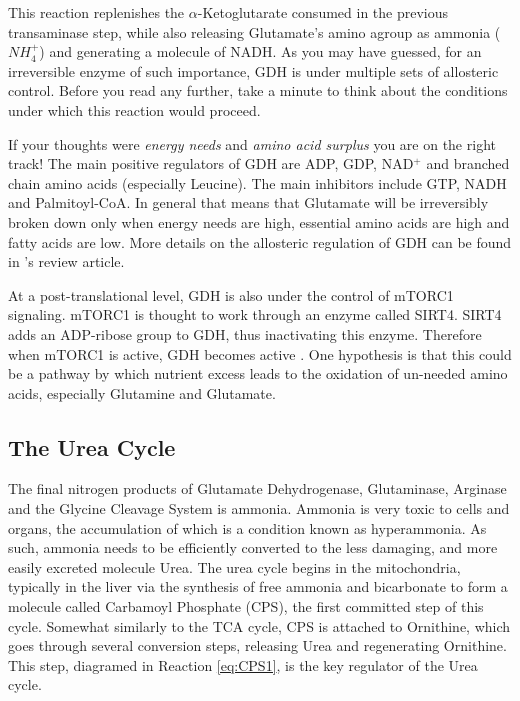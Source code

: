 \documentclass{tufte-handout}
\begin{document}
This reaction replenishes the $\alpha$-Ketoglutarate consumed in the previous transaminase step, while also releasing Glutamate's amino agroup as ammonia ($NH_4^+$) and generating a molecule of NADH.  As you may have guessed, for an irreversible enzyme of such importance, GDH is under multiple sets of allosteric control.  Before you read any further, take a minute to think about the conditions under which this reaction would proceed.

If your thoughts were \emph{energy needs} and \emph{amino acid surplus} you are on the right track!  The main positive regulators of GDH are ADP, GDP, NAD$^+$ and branched chain amino acids (especially Leucine).  The main inhibitors include GTP, NADH and Palmitoyl-CoA.  In general that means that Glutamate will be irreversibly broken down only when energy needs are high, essential amino acids are high and fatty acids are low.  More details on the allosteric regulation of GDH can be found in \citet{Smith2008}'s review article.  

At a post-translational level, GDH is also under the control of mTORC1 signaling.  mTORC1 is thought to work through an enzyme called SIRT4.  SIRT4 adds an ADP-ribose group to GDH, thus inactivating this enzyme.  Therefore when mTORC1 is active, GDH becomes active \citep{Csibi2013}.  One hypothesis is that this could be a pathway by which nutrient excess leads to the oxidation of un-needed amino acids, especially Glutamine and Glutamate.

\subsection{The Urea Cycle}

The final nitrogen products of Glutamate Dehydrogenase, Glutaminase, Arginase and the Glycine Cleavage System is ammonia.  Ammonia is very toxic to cells and organs, the accumulation of which is a condition known as hyperammonia.  As such, ammonia needs to be efficiently converted to the less damaging, and more easily excreted molecule Urea.  The urea cycle begins in the mitochondria, typically in the liver via the synthesis of free ammonia and bicarbonate to form a molecule called Carbamoyl Phosphate (CPS), the first committed step of this cycle.  Somewhat similarly to the TCA cycle, CPS is attached to Ornithine, which goes through several conversion steps, releasing Urea and regenerating Ornithine.  This step, diagramed in Reaction \ref{eq:CPS1}, is the key regulator of the Urea cycle.
\end{document}

